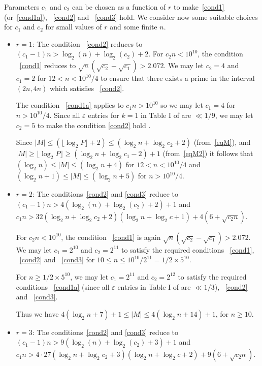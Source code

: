 Parameters $c_1$ and $c_2$ can be chosen as a function of $r$ to
make~\eqref{cond1} (or~\eqref{cond1a}), ~\eqref{cond2} and
~\eqref{cond3} hold. We consider now some suitable choices for $c_1$
and $c_2$ for small values of $r$ and some finite $n$.
\begin{itemize}
\item $r=1$: The condition ~\eqref{cond2} reduces to $(c_1-1)n >
\log_2(n)+\log_2(c_2)+2$. For $c_2n < 10^{10}$, the condition
~\eqref{cond1} reduces to $\sqrt{n}(\sqrt{c_2}-\sqrt{c_1})> 2.072$.
We may let $c_2=4$ and $c_1=2$ for $12<n<10^{10}/4$ to ensure that
there exists a prime in the interval $(2n,4n)$ which satisfies
~\eqref{cond2}.

The condition ~\eqref{cond1a} applies to $c_1n>10^{10}$ so we may
let $c_1=4$
 for $n>10^{10}/4$. Since all $\varepsilon$ entries for $k=1$ in Table I of \cite{rrumely}
 are $\ll 1/9$, we may let $c_2=5$ to make the condition \eqref{cond2} hold .

 Since $|M| \leq (\lfloor\log_2P\rfloor+2)\leq (\log_2 n+\log_2 c_2+2)$ (from~\eqref{eqM}), and
$|M| \geq \lfloor \log_2P\rfloor\geq (\log_2 n+\log_2 c_1-2)+1$
(from~\eqref{eqM2})
 it
 follows that $(\log_2n) \leq |M| \leq (\log_2n+4 )$ for $12<n<10^{10}/4$ and $(\log_2 n+1) \leq |M| \leq (\log_2n+5 )$ for
 $n>10^{10}/4$.
 \item $r=2$: The conditions~\eqref{cond2} and \eqref{cond3} reduce
 to $(c_1-1)n >4(
\log_2(n)+\log_2(c_2)+2)+1$ and $c_1n > 32(\log_2 n+ \log_2
c_2+2)(\log_2n+\log_2 c+1)+4(6+\sqrt{c_2n})$.

For $c_2n < 10^{10}$, the condition ~\eqref{cond1} is again
$\sqrt{n}(\sqrt{c_2}-\sqrt{c_1})> 2.072$. We may let $c_1=2^{10}$
and $c_2=2^{11}$ to satisfy the required conditions ~\eqref{cond1},
~\eqref{cond2} and ~\eqref{cond3} for $10 \leq n\leq
10^{10}/2^{11}=1/2\times 5^{10}$.


For $n \geq 1/2 \times 5^{10}$, we may let $c_1=2^{11}$ and
$c_2=2^{12}$ to satisfy the required conditions ~\eqref{cond1a}
(since all $\varepsilon$ entries in Table I of \cite{rrumely} are
$\ll 1/3$), ~\eqref{cond2} and ~\eqref{cond3}.

Thus we have $4(\log_2n +7)+1 \leq |M| \leq 4(\log_2n+14)+1$, for
$n\geq 10$.

\item
$r=3$: The conditions~\eqref{cond2} and \eqref{cond3} reduce
 to $(c_1-1)n >9(
\log_2(n)+\log_2(c_2)+3)+1$ and $c_1n > 4\cdot27(\log_2 n+ \log_2
c_2+3)(\log_2n+\log_2 c+2)+9(6+\sqrt{c_2n})$.


\end{itemize}
